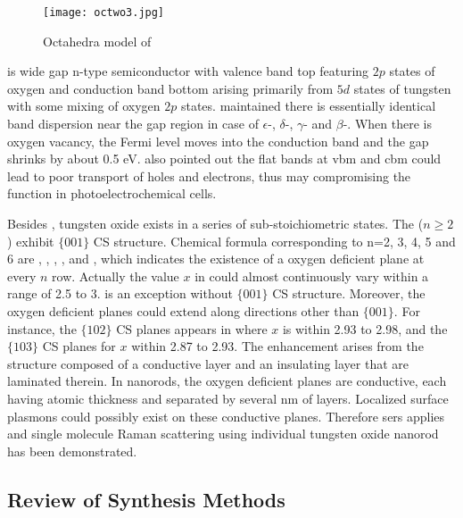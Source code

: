 \begin{figure}[htb]
\centering
\texttt{[image: octwo3.jpg]}
\caption[Octahedra model of ]{Octahedra model of }
\label{fig:wo3oct}
\end{figure}

 is wide gap n-type semiconductor with valence band top featuring $2p$ states of oxygen and conduction band bottom arising primarily from $5d$ states of tungsten with some mixing of oxygen $2p$ states.\cite{Gillet2004} \citeauthor{Migas2010a} maintained there is essentially identical band dispersion near the gap region in case of $\epsilon$-, $\delta$-, $\gamma$- and $\beta$-.\cite{Migas2010a} When there is oxygen vacancy, the Fermi level moves into the conduction band and the gap shrinks by about 0.5 eV. \citeauthor{Migas2010a} also pointed out the flat bands at \gls{vbm} and \gls{cbm} could lead to poor transport of holes and electrons, thus may compromising the function in photoelectrochemical cells.

Besides , tungsten oxide exists in a series of sub-stoichiometric states. The  ($n \geq 2$) exhibit $\{ 001 \}$ CS structure. Chemical formula corresponding to n=2, 3, 4, 5 and 6 are , , , , and , which indicates the existence of a oxygen deficient plane at every $n$ row. Actually the value $x$ in  could almost continuously vary within a range of 2.5 to 3.  is an exception without $\{ 001 \}$ CS structure. Moreover, the oxygen deficient planes could extend along directions other than $\{ 001 \}$. For instance, the $\{ 102 \}$ CS planes appears in  where $x$ is within 2.93 to 2.98, and  the $\{ 103 \}$ CS planes for $x$ within 2.87 to 2.93.\cite{Sloan1999} The enhancement arises from the structure composed of a conductive layer and an insulating layer that are laminated therein.\cite{Shingaya2013} In  nanorods, the oxygen deficient planes are conductive, each having atomic thickness and separated by several nm of  layers. Localized surface plasmons could possibly exist on these conductive planes. Therefore \gls{sers} applies and single molecule Raman scattering using individual tungsten oxide nanorod has been demonstrated.\cite{Shingaya2013}

\subsection{Review of Synthesis Methods}\label{sec:woxgrowth}

